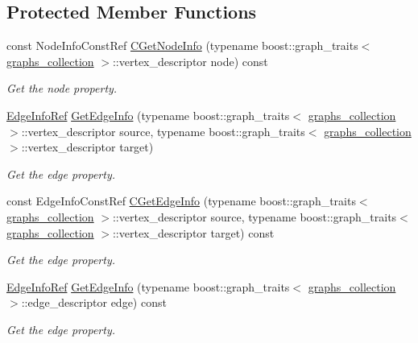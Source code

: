 \subsection*{Protected Member Functions}
\begin{DoxyCompactItemize}
\item 
const Node\+Info\+Const\+Ref \hyperlink{structgraph_a6dfc893ca9b8dfcad31c8b2267f0b160}{C\+Get\+Node\+Info} (typename boost\+::graph\+\_\+traits$<$ \hyperlink{structgraphs__collection}{graphs\+\_\+collection} $>$\+::vertex\+\_\+descriptor node) const
\begin{DoxyCompactList}\small\item\em Get the node property. \end{DoxyCompactList}\item 
\hyperlink{edge__info_8hpp_a65ddc964b1738667fc720f0de33aeef9}{Edge\+Info\+Ref} \hyperlink{structgraph_a27f542404060a7ffa5ece86d7979a6c3}{Get\+Edge\+Info} (typename boost\+::graph\+\_\+traits$<$ \hyperlink{structgraphs__collection}{graphs\+\_\+collection} $>$\+::vertex\+\_\+descriptor source, typename boost\+::graph\+\_\+traits$<$ \hyperlink{structgraphs__collection}{graphs\+\_\+collection} $>$\+::vertex\+\_\+descriptor target)
\begin{DoxyCompactList}\small\item\em Get the edge property. \end{DoxyCompactList}\item 
const Edge\+Info\+Const\+Ref \hyperlink{structgraph_a342774370b750895ea04187ef9b00969}{C\+Get\+Edge\+Info} (typename boost\+::graph\+\_\+traits$<$ \hyperlink{structgraphs__collection}{graphs\+\_\+collection} $>$\+::vertex\+\_\+descriptor source, typename boost\+::graph\+\_\+traits$<$ \hyperlink{structgraphs__collection}{graphs\+\_\+collection} $>$\+::vertex\+\_\+descriptor target) const
\begin{DoxyCompactList}\small\item\em Get the edge property. \end{DoxyCompactList}\item 
\hyperlink{edge__info_8hpp_a65ddc964b1738667fc720f0de33aeef9}{Edge\+Info\+Ref} \hyperlink{structgraph_ae7792ce7a4df2195b3ee3cb17296df03}{Get\+Edge\+Info} (typename boost\+::graph\+\_\+traits$<$ \hyperlink{structgraphs__collection}{graphs\+\_\+collection} $>$\+::edge\+\_\+descriptor edge) const
\begin{DoxyCompactList}\small\item\em Get the edge property. \end{DoxyCompactList}\item 

\end{DoxyCompactItemize}
